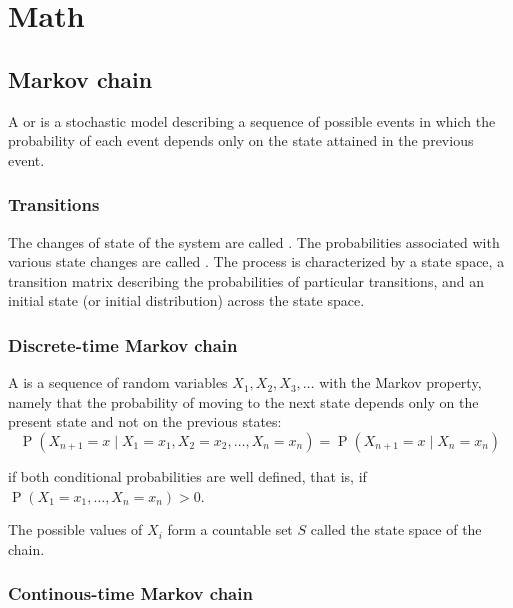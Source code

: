 
\chapter{Math}
\label{cha:probability}

\section{Markov chain}
\label{sec:markov-chain}

A  or  is a stochastic model describing a sequence of possible events in which the probability of each event depends only on the state attained in the previous event.

\subsection{Transitions}
\label{sec:transitions}

The changes of state of the system are called .
The probabilities associated with various state changes are called .
The process is characterized by a state space, a transition matrix describing the probabilities of particular transitions, and an initial state (or initial distribution) across the state space.

\subsection{Discrete-time Markov chain}
\label{sec:discrete-time-markov}

A  is a sequence of random variables $X_1, X_2, X_3, \ldots$ with the Markov property, namely that the probability of moving to the next state depends only on the present state and not on the previous states:
\begin{equation}
  \label{eq:14}
   \operatorname{P}\left(X_{n+1}=x \mid X_1=x_1, X_2=x_2, \ldots, X_n=x_n\right)=\operatorname{P}\left(X_{n+1}=x \mid X_n=x_n\right)
\end{equation}

if both conditional probabilities are well defined, that is, if \(\operatorname{P}\left(X_1=x_1, \ldots, X_n=x_n\right)>0\).



The possible values of $X_i$ form a countable set $S$ called the state space of the chain.


\subsection{Continous-time Markov chain}
\label{sec:cont-time-mark}

